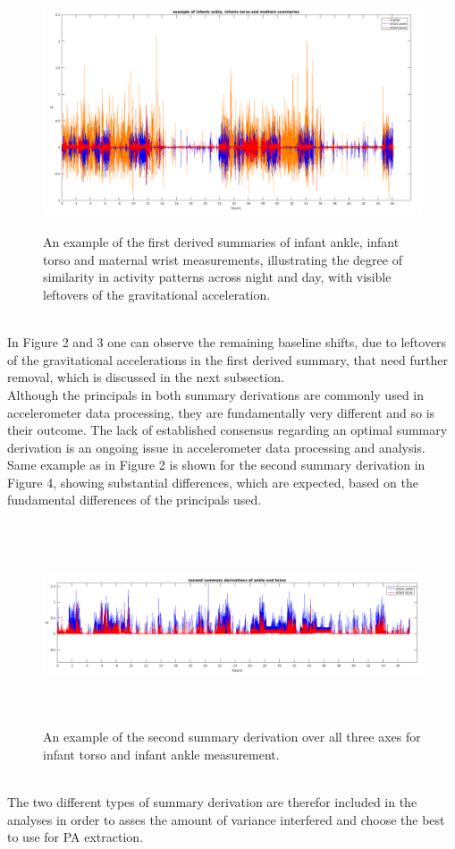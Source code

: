 \documentclass{article}
\begin{document}
{\begin{figure}[h!]
\includegraphics[width=15cm, height=7cm]{exampleTorsoAnkle2.png}
\caption{An example of the first derived summaries of infant ankle, infant torso and maternal wrist measurements, illustrating the degree of similarity in activity patterns across night and day, with visible leftovers of the gravitational acceleration.}
\end{figure}
\\
In Figure 2 and 3 one can observe the remaining baseline shifts, due to leftovers of the gravitational accelerations in the first derived summary, that need further removal, which is discussed in the next subsection. \\
Although the principals in both summary derivations are commonly used in accelerometer data processing, they are fundamentally very different and so is their outcome. The lack of established consensus regarding an optimal summary derivation is an ongoing issue in accelerometer data processing and analysis. Same example as in Figure 2 is shown for the second summary derivation in Figure 4, showing substantial differences, which are expected, based on the fundamental differences of the principals used.
\begin{figure}[h!]
\includegraphics[width=15cm, height=6cm]{bandpass_summary_example.png}
\caption{An example of the second summary derivation over all three axes for infant torso and infant ankle measurement.}
\end{figure}
\\
The two different types of summary derivation are therefor included in the analyses in order to asses the amount of variance interfered and choose the best to use for PA extraction.
\\
}
\end{document}
